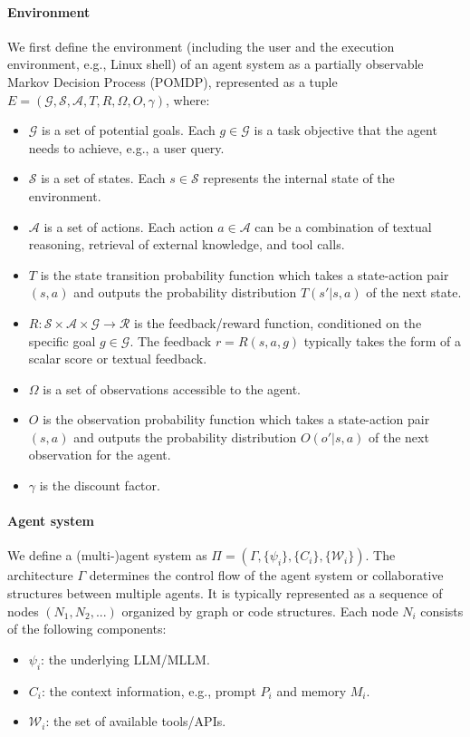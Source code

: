 \documentclass[10pt]{article} %
\begin{document}
\paragraph{Environment} We first define the environment (including the user and the execution environment, e.g., Linux shell) of an agent system as a partially observable Markov Decision Process (POMDP), represented as a tuple $E=(\mathcal{G}, \mathcal{S}, \mathcal{A}, T, R, \Omega, O, \gamma)$, where:
\begin{itemize}
\item $\mathcal{G}$ is a set of potential goals. Each $g\in \mathcal{G}$ is a task objective that the agent needs to achieve, e.g., a user query.
\item $\mathcal{S}$ is a set of states. Each $s\in \mathcal{S}$ represents the internal state of the environment.
\item $\mathcal{A}$ is a set of actions. Each action $a\in \mathcal{A}$ can be a combination of textual reasoning, retrieval of external knowledge, and tool calls.
\item $T$ is the state transition probability function which takes a state-action pair $(s,a)$ and outputs the probability distribution $T(s'|s,a)$ of the next state.
\item $R:\mathcal{S}\times \mathcal{A} \times \mathcal{G} \rightarrow \mathcal{R}$ is the feedback/reward function, conditioned on the specific goal $g\in \mathcal{G}$. The feedback $r=R(s,a,g)$ typically takes the form of a scalar score or textual feedback.
\item $\Omega$ is a set of observations accessible to the agent.
\item $O$ is the observation probability function which takes a state-action pair $(s,a)$ and outputs the probability distribution $O(o'|s,a)$ of the next observation for the agent.
\item $\gamma$ is the discount factor.
\end{itemize}

\paragraph{Agent system} We define a (multi-)agent system as $\Pi =(\Gamma,\{\psi_i\}, \{C_i\},\{\mathcal{W}_i\})$. The architecture $\Gamma$ determines the control flow of the agent system or collaborative structures between multiple agents. It is typically represented as a sequence of nodes $(N_1, N_2, ...)$ organized by graph or code structures. Each node $N_i$ consists of the following components:
\begin{itemize}
\item $\psi_i$: the underlying LLM/MLLM.
\item $C_i$: the context information, e.g., prompt $P_i$ and memory $M_i$.
\item $\mathcal{W}_i$: the set of available tools/APIs.
\end{itemize}
\end{document}
